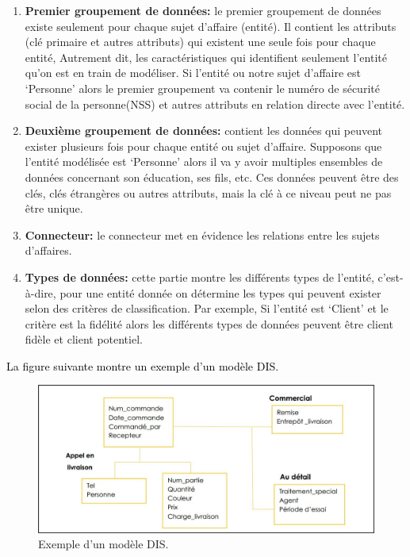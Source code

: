 \documentclass[a4paper,12pt]{report}
\begin{document}
\begin{enumerate}
	\item \textbf{Premier groupement de données: }
	le premier groupement de données existe seulement pour chaque sujet d’affaire (entité). Il contient les attributs (clé primaire et autres attributs) qui existent une seule fois pour chaque entité, Autrement dit, les caractéristiques qui identifient seulement l’entité qu’on est en train de modéliser. Si l’entité ou notre sujet d’affaire est ‘Personne’ alors le premier groupement va contenir le numéro de sécurité social de la personne(NSS) et autres attributs en relation directe avec l’entité.
	
	\item \textbf{Deuxième groupement de données: }	
	contient les données qui peuvent exister plusieurs fois pour chaque entité ou sujet d’affaire. Supposons que l’entité modélisée est ‘Personne’ alors il va y avoir multiples ensembles de données concernant son éducation, ses fils, etc. Ces données peuvent être des clés, clés étrangères ou autres attributs, mais la clé à ce niveau peut ne pas être unique.
	
	\item \textbf{Connecteur: }	
	le connecteur met en évidence les relations entre les sujets d’affaires.
	\item \textbf{Types de données: }	
	cette partie montre les différents types de l’entité, c’est-à-dire, pour une entité donnée on détermine les types qui peuvent exister selon des critères de classification. Par exemple, Si l’entité est ‘Client’ et le critère est la fidélité alors les différents types de données peuvent être client fidèle et client potentiel.
	
	\end{enumerate}
	
	
	
\textcolor{black}{La figure suivante montre un exemple d’un modèle DIS.}

\begin{figure}[H]

\begin{center}
\includegraphics[width=0.7\linewidth]{./images/5}
\end{center}

\caption{Exemple d'un modèle DIS. \citep{inmon2000}}
\label{fig:5}

\end{figure}
\end{document}

